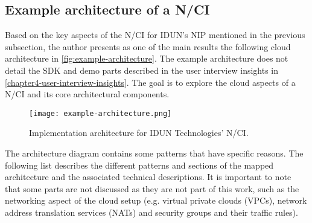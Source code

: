 \subsection{Example architecture of a N/CI}
\label{chapter5-example-architecture-of-a-nci}

Based on the key aspects of the N/CI for IDUN's NIP mentioned in the previous subsection, the author presents as one of the main results the following cloud architecture in \autoref{fig:example-architecture}. The example architecture does not detail the SDK and demo parts described in the user interview insights in \autoref{chapter4-user-interview-insights}. The goal is to explore the cloud aspects of a N/CI and its core architectural components.

\begin{figure}[!ht]
  \centering
  \texttt{[image: example-architecture.png]}
  \caption{Implementation architecture for IDUN Technologies' N/CI.}
  \label{fig:example-architecture}
\end{figure}

The architecture diagram contains some patterns that have specific reasons. The following list describes the different patterns and sections of the mapped architecture and the associated technical descriptions. It is important to note that some parts are not discussed as they are not part of this work, such as the networking aspect of the cloud setup (e.g. virtual private clouds (VPCs), network address translation services (NATs) and security groups and their traffic rules).

